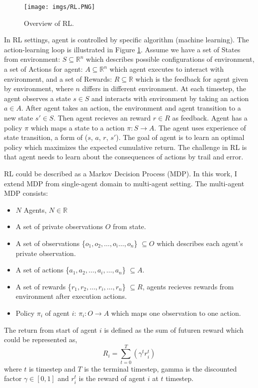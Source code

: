 \documentclass[11pt,twocolumn]{jarticle} %
\begin{document}
\begin{figure}[h]
 \begin{center}
  \texttt{[image: imgs/RL.PNG]}
  \caption{
  Overview of RL.
  }
  \label{fig:rl}
 \end{center}
\end{figure}

In RL settings, agent is controlled by specific algorithm (machine learning). The action-learning loop is illustrated in Figure \ref{fig:rl}. Assume we have a set of States from environment: $S \subseteq \mathbb{R}^n$ which describes possible configurations of environment, a set of Actions for agent: $A \subseteq \mathbb{R}^n$ which agent executes to interact with environment, and a set of Rewards: $R \subseteq \mathbb{R}$ which is the feedback for agent given by environment, where $n$ differs in different environment. At each timestep, the agent observes a state $s \in S$ and interacts with environment by taking an action $a \in A$. After agent takes an action, the environment and agent transition to a new state $s' \in S$. Then agent recieves an reward $r \in R$  as feedback. Agent has a policy $\pi$ which maps  a state to a action $\pi: S \rightarrow A$. The agent uses experience of state transition, a form of ($s$, $a$, $r$, $s'$). The goal of agent is to learn an optimal policy which maximizes the expected cumulative return. The challenge in RL is that agent needs to learn about the consequences of actions by trail and error. \par

RL could be described as a Markov Decision Process (MDP). In this work, I extend MDP from single-agent domain to multi-agent setting. The multi-agent MDP consists:
\begin{itemize}
  \item $N$ Agents, $N \in \mathbb{R}$
  \item A set of private observations $O$ from state. 
  \item A set of observations \{${o_1, o_2,\ldots, o_i\ldots, o_n}$\} $\subseteq O$ which describes each agent's private observation.
  \item A set of actions \{${a_1, a_2,\ldots, a_i,\ldots, a_n}$\} $\subseteq A$.
  \item A set of rewards \{${r_1, r_2,\ldots, r_i,\ldots, r_n}$\} $\subseteq R$, agents recieves rewards from environment after execution actions.
  \item Policy $\pi_i$ of agent $i$: $\pi_i: O \rightarrow A$ which maps one observation to one action.
\end{itemize}
The return from start of agent $i$ is defined as the sum of futuren reward which could be represented as, 
$$ R_i = \sum_{t=0}^{T}(\gamma^t r^{t}_i) $$
where $t$ is timestep and $T$ is the terminal timestep, gamma is the discounted factor $\gamma \in [0, 1]$ and $r^{t}_i$ is the reward of agent $i$ at $t$ timestep.
\end{document}
